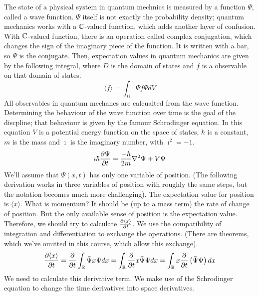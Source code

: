 \documentclass[fleqn,letterpaper]{report}
\begin{document}
The state of a physical system in quantum mechnics is measured
by a function $\Psi$, called a wave function. $\Psi$ itself
is not exactly the probability density; quantum mechanics
works with a $\mathbb{C}$-valued function, which adds another layer of
confusion. With $\mathbb{C}$-valued function, there is an operation
called complex conjugation, which changes the sign of the
imaginary piece of the function. It is written with a bar, so
$\bar{\Psi}$ is the conjugate. Then, expectation values in
quantum mechanics are given by the following integral, where
$D$ is the domain of states and $f$ is a observable on that
domain of states.
\begin{equation*}
\langle f\rangle = \int_D \bar{\Psi} f \Psi dV
\end{equation*}
All observables in quantum mechancs are calcualted from the
wave function. Determining the behaviour of the wave function
over time is the goal of the discpline; that behaviour is
given by the famour Schrodinger equation. In this equation $V$
is a potential energy function on the space of states, $\hbar$
is a constant, $m$ is the mass and $\imath$ is the imaginary
number, with $\imath^2 = -1$. 
\begin{equation*}
\imath \hbar \frac{\partial \Psi}{\partial t} = \frac{-\hbar}{2m}
\nabla^2 \Psi + V \Psi
\end{equation*}
We'll assume that $\Psi(x,t)$ has only one variable of
position. (The following derivation works in three variables
of position with roughly the same steps, but the notation
becomes much more challenging). The expectation value for
position is $\langle x\rangle$. What is momentum? It should
be (up to a mass term) the rate of change of position. But the
only available sense of position is the expectation value.
Therefore, we should try to calculate $\frac{\partial \langle
x\rangle}{\partial t}$. We use the compatibility of integration
and differentiation to exchange the operations. (There are
theorems, which we've omitted in this course, which allow this
exchange).
\begin{equation*}
\frac{\partial \langle x\rangle}{\partial t} = \frac{\partial}{\partial t}
\int_{\mathbb{R}} \bar{\Psi} x
\Psi dx = \int_{\mathbb{R}} \frac{\partial}{\partial t} x \bar{\Psi}\Psi dx =
\int_{\mathbb{R}} x \frac{\partial}{\partial t} \left( \bar{\Psi}\Psi \right) dx
\end{equation*}
We need to calculate this derivative term. We make use of the
Schrodinger equation to change the time derivatives into space
derivatives. 
\end{document}
